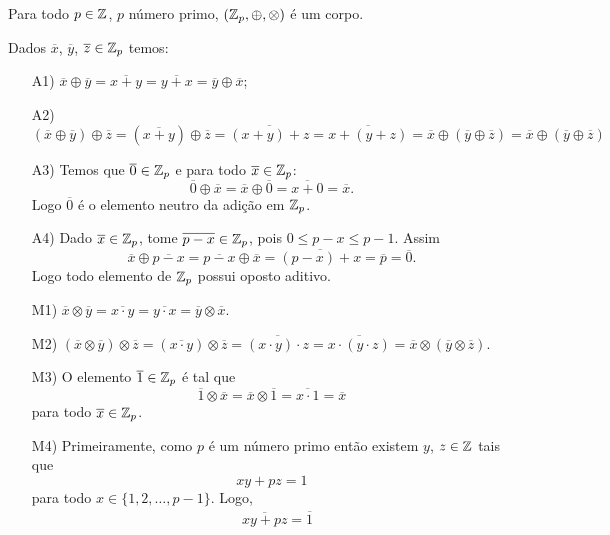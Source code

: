 \begin{teorema}
	Para todo $p \in \mathbb{Z}$, $p$ n\'umero primo, $(\mathbb{Z}_p, \oplus, \otimes)$ \'e um corpo.
\end{teorema}
\begin{prova}
	Dados $\overline{x}$, $\overline{y}$, $\overline{z} \in \mathbb{Z}_p$ temos:
	\begin{enumerate}
		\item[A1)] $\overline{x} \oplus \overline{y} = \overline{x + y} = \overline{y + x} = \overline{y} \oplus \overline{x}$;
		\item[A2)] $(\overline{x} \oplus \overline{y}) \oplus \overline{z} = (\overline{x + y}) \oplus \overline{z} = \overline{(x + y) + z} = \overline{x + (y + z)} = \overline{x} \oplus (\overline{y} \oplus \overline{z}) = \overline{x} \oplus (\overline{y} \oplus \overline{z})$
		\item[A3)] Temos que $\overline{0} \in \mathbb{Z}_p$ e para todo $\overline{x} \in \mathbb{Z}_p$:
		\[
		  \overline{0} \oplus \overline{x} = \overline{x} \oplus \overline{0} = \overline{x + 0} = \overline{x}.
		\]
		Logo $\overline{0}$ \'e o elemento neutro da adi\c{c}\~ao em $\mathbb{Z}_p$.
		\item[A4)] Dado $\overline{x} \in \mathbb{Z}_p$, tome $\overline{p - x} \in \mathbb{Z}_p$, pois $0 \le p - x \le p - 1$. Assim
		\[
		  \overline{x} \oplus \overline{p - x} = \overline{p - x} \oplus \overline{x} = \overline{(p - x) + x} = \overline{p} = \overline{0}.
		\]
		Logo todo elemento de $\mathbb{Z}_p$ possui oposto aditivo.
		\item[M1)] $\overline{x} \otimes \overline{y} = \overline{x\cdot y} = \overline{y \cdot x} = \overline{y} \otimes \overline{x}$.
		\item[M2)] $(\overline{x} \otimes \overline{y}) \otimes \overline{z} = (\overline{x\cdot y}) \otimes \overline{z} = \overline{(x\cdot y) \cdot z} = 
		\overline{x\cdot (y\cdot z)} = \overline{x} \otimes (\overline{y} \otimes \overline{z})$.
		\item[M3)] O elemento $\overline{1} \in \mathbb{Z}_p$ \'e tal que
		\[
		  \overline{1} \otimes \overline{x} = \overline{x} \otimes \overline{1} = \overline{x\cdot 1} = \overline{x}
		\]
		para todo $\overline{x} \in \mathbb{Z}_p$.
		\item[M4)] Primeiramente, como $p$ \'e um n\'umero primo ent\~ao existem $y$, $z \in \mathbb{Z}$ tais que
		\[
		  xy + pz = 1
		\]
		para todo $x \in \{1, 2, \dots, p - 1\}$. Logo,
		\begin{align*}
			&\overline{xy + pz} = \overline{1}\\

\end{align*}
\end{enumerate}
\end{prova}
